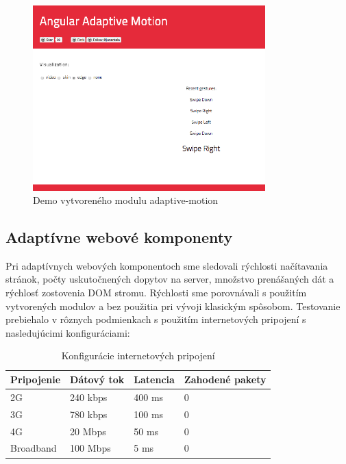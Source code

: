 \begin{figure}[H]
  \centering
  \includegraphics[width=0.8\textwidth]{img/adaptivemotion.png}
  \caption[Demo vytvoreného modulu adaptive-motion]{
    Demo vytvoreného modulu adaptive-motion}
  \label{fig: adaptivemotion}
\end{figure}




\newpage
\subsection{Adaptívne webové komponenty} %
\label{sub:webov_komponenty}

Pri adaptívnych webových komponentoch sme sledovali rýchlosti načítavania stránok, počty uskutočnených dopytov na server, množstvo prenášaných dát a rýchlosť zostovenia DOM stromu. Rýchlosti sme porovnávali s použitím vytvorených modulov a bez použitia pri vývoji klasickým spôsobom. Testovanie prebiehalo v rôznych podmienkach s použitím internetových pripojení s nasledujúcimi konfiguráciami:

\begin{table}[H]
  \begin{tabular}{ | l | l | l | l |}
    \hline
    Pripojenie & Dátový tok & Latencia & Zahodené pakety \\ \hline
    2G & 240 kbps & 400 ms & 0  \\  \hline
    3G & 780 kbps & 100 ms & 0  \\ \hline
    4G & 20 Mbps & 50 ms & 0  \\ \hline
    Broadband & 100 Mbps & 5 ms & 0  \\
    \hline
  \end{tabular}
  \caption[Konfigurácie internetových pripojení]{Konfigurácie internetových pripojení}
\end{table}

